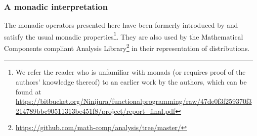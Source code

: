 \documentclass[11pt, leqno, titlepage]{article}
\theoremstyle{definition}
\begin{document}




\subsubsection{A monadic interpretation}
\label{sec:monad-interp}

The monadic operators presented here have been formerly introduced by \cite{rml-paper}
and satisfy the usual monadic  properties\footnote{We
  refer the reader who is unfamiliar with monads (or requires proof of the authors'
  knowledge thereof) to an earlier work by the authors, which can be found at
  \url{https://bitbucket.org/Ninijura/functionalprogramming/raw/47de0f3f259370f3214789bbc90511313be451f8/project/report_final.pdf}}.
They are also used by the Mathematical Components compliant Analysis Library\footnote
{\url{https://github.com/math-comp/analysis/tree/master/}} in their representation of
distributions.
\end{document}
